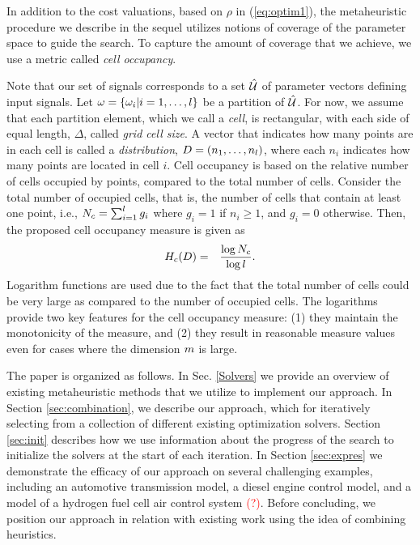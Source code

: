 In addition to the cost valuations, based on $\rho$ in (\ref{eq:optim1}),
the metaheuristic procedure we describe in the sequel utilizes notions of coverage of the parameter space to guide the search.
To capture the amount of coverage that we achieve, we use a metric called {\em cell occupancy}. 

Note that our set of signals corresponds to a set $\hat{\mathcal{U}}$ of parameter vectors defining input signals.
Let $\omega=\{ \omega_i | i=1,\ldots,
l \}$ be a partition of $\hat{\mathcal{U}}$. For now, we assume that each partition element,
which we call a \emph{cell}, is rectangular, with each side of equal
length, $\Delta$, called \emph{grid cell size}. A
vector that indicates how many points are in each cell is called a
\emph{distribution}, $D=(n_1,\ldots,n_l)$,
where each $n_i$ indicates how many points are located in cell $i$.
Cell occupancy is based on the relative number of cells occupied by
points, compared to the total number of cells. Consider the total
number of occupied cells, that is, the number of cells that contain
at least one point, i.e., $N_c =  \sum_{i=1}^{l} g_i$  
where $g_i = 1$ if  $n_i\geq 1$, and $g_i = 0$ otherwise. Then, the proposed cell occupancy measure is given as
\begin{eqnarray*}
H_c(D) & = & \frac{\log N_c}{\log l}.
\end{eqnarray*}
Logarithm functions are used due to the fact that the total number of cells could be very large as compared to the number of occupied cells. The logarithms provide two key features for the cell occupancy measure: (1) they maintain the monotonicity of the measure, and (2) they result in reasonable measure values even for cases where the dimension $m$ is  large. 


The paper is organized as follows. 
In Sec. \ref{Solvers} we provide an overview of existing metaheuristic methods that we utilize to implement our approach. 
In Section \ref{sec:combination}, we describe our approach, which for iteratively selecting from a collection of different existing optimization solvers.
Section \ref{sec:init} describes how we use information about the progress of the search to initialize the solvers at the start of each iteration. 
In Section \ref{sec:expres} we demonstrate the efficacy of our approach on several challenging examples, including an automotive transmission model, a diesel engine control model, and a model of a hydrogen fuel cell air control system \textcolor{red}{(?)}. Before concluding, we position our approach in relation with existing work using the idea of combining heuristics. 
